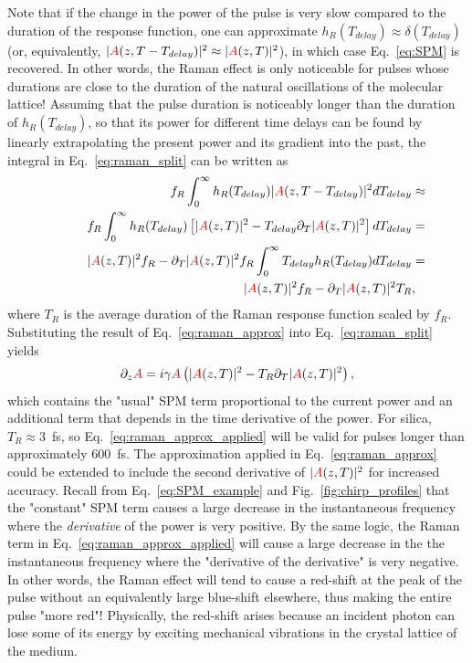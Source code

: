 Note that if the change in the power of the pulse is very slow compared to the duration of the response function, one can approximate $h_R(T_{delay})\approx \delta(T_{delay})$ (or, equivalently, $|\textcolor{red}{A}(z,T-T_{delay})|^2\approx|\textcolor{red}{A}(z,T)|^2$), in which case Eq.~\ref{eq:SPM} is recovered. In other words, the Raman effect is only noticeable for pulses whose durations are close to the duration of the natural oscillations of the molecular lattice! Assuming that the pulse duration is noticeably longer than the duration of $h_R(T_{delay})$, so that its power for different time delays can be found by linearly extrapolating the present power and its gradient into the past, the integral in Eq.~\ref{eq:raman_split} can be written as 
\begin{align}
\label{eq:raman_approx}
    f_R \int_{0}^{\infty} h_R(T_{delay})|\textcolor{red}{A}(z,T-T_{delay})|^2 dT_{delay} &\approx\\ \nonumber \quad\quad\quad f_R \int_{0}^{\infty} h_R(T_{delay})\left[ 
  |\textcolor{red}{A}(z,T)|^2-T_{delay}\partial_T|\textcolor{red}{A}(z,T)|^2 \right] dT_{delay} &=\\ \nonumber \quad\quad\quad  |\textcolor{red}{A}(z,T)|^2f_R- \partial_T|\textcolor{red}{A}(z,T)|^2 f_R\int_{0}^{\infty} T_{delay} h_R(T_{delay}) 
   dT_{delay}&=\\ \nonumber \quad\quad\quad  |\textcolor{red}{A}(z,T)|^2f_R- \partial_T|\textcolor{red}{A}(z,T)|^2 T_R &,
\end{align}
where $T_R$ is the average duration of the Raman response function scaled by $f_R$. Substituting the result of Eq.~\ref{eq:raman_approx} into Eq.~\ref{eq:raman_split} yields
\begin{align}
    \label{eq:raman_approx_applied}
\partial_z \textcolor{red}{A} = i\gamma\textcolor{red}{A}\left( 
|\textcolor{red}{A}(z,T)|^2-T_R \partial_T|\textcolor{red}{A}(z,T)|^2\right),
\end{align}
which contains the "usual" SPM term proportional to the current power and an additional term that depends in the time derivative of the power. For silica, $T_R\approx 3$~fs, so Eq.~\ref{eq:raman_approx_applied} will be valid for pulses longer than approximately 600~fs. The approximation applied in Eq.~\ref{eq:raman_approx} could be extended to include the second derivative of $|\textcolor{red}{A}(z,T)|^2$ for increased accuracy. Recall from Eq.~\ref{eq:SPM_example} and Fig.~\ref{fig:chirp_profiles} that the "constant" SPM term causes a large decrease in the instantaneous frequency where the \emph{derivative} of the power is very positive. By the same logic, the Raman term in Eq.~\ref{eq:raman_approx_applied} will cause a large decrease in the the instantaneous frequency where the "derivative of the derivative" is very negative. In other words, the Raman effect will tend to cause a red-shift at the peak of the pulse without an equivalently large blue-shift elsewhere, thus making the entire pulse "more red"! Physically, the red-shift arises because an incident photon can lose some of its energy by exciting mechanical vibrations in the crystal lattice of the medium. 

